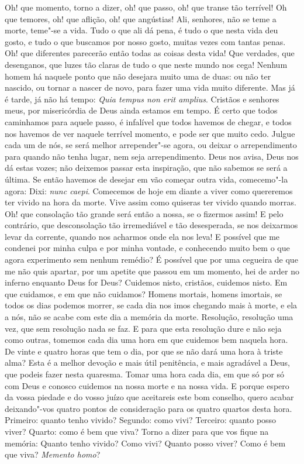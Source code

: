 Oh! que momento, torno a dizer, oh! que passo, oh! que transe
tão terrível! Oh que temores, oh! que aflição, oh! que angústias! Ali,
senhores, não se teme a morte, teme"-se a vida. Tudo o que ali dá pena, é
tudo o que nesta vida deu gosto, e tudo o que buscamos por nosso gosto,
muitas vezes com tantas penas. Oh! que diferentes parecerão então todas
as coisas desta vida! Que verdades, que desenganos, que luzes tão claras
de tudo o que neste mundo nos cega! Nenhum homem há naquele ponto que
não desejara muito uma de duas: ou não ter nascido, ou tornar a nascer
de novo, para fazer uma vida muito diferente. Mas já é tarde, já não há
tempo: \emph{Quia tempus non erit amplius}. Cristãos e %
senhores meus, por misericórdia de Deus ainda estamos em tempo. É certo
que todos caminhamos para aquele passo, é infalível que todos havemos de
chegar, e todos nos havemos de ver naquele terrível momento, e pode ser
que muito cedo. Julgue cada um de nós, se será melhor arrepender"-se
agora, ou deixar o arrependimento para quando não tenha lugar, nem seja
arrependimento. Deus nos avisa, Deus nos dá estas vozes; não deixemos
passar esta inspiração, que não sabemos se será a última. Se então
havemos de desejar em vão começar outra vida, comecemo"-la agora: Dixi:
\emph{nunc caepi}. Comecemos de hoje em diante a viver como quereremos
ter vivido na hora da morte. Vive assim como quiseras ter vivido quando
morras. Oh! que consolação tão grande será então a nossa, se o fizermos
assim! E pelo contrário, que desconsolação tão irremediável e tão
desesperada, se nos deixarmos levar da corrente, quando nos acharmos
onde ela nos leva! E possível que me condenei por minha culpa e por
minha vontade, e conhecendo muito bem o que agora experimento sem nenhum
remédio? É possível que por uma cegueira de que me não quis apartar, por
um apetite que passou em um momento, hei de arder no inferno enquanto
Deus for Deus? Cuidemos nisto, cristãos, cuidemos nisto. Em que
cuidamos, e em que não cuidamos? Homens mortais, homens imortais, se
todos os dias podemos morrer, se cada dia nos imos chegando mais à
morte, e ela a nós, não se acabe com este dia a memória da morte.
Resolução, resolução uma vez, que sem resolução nada se faz. E para que
esta resolução dure e não seja como outras, tomemos cada dia uma hora em
que cuidemos bem naquela hora. De vinte e quatro horas que tem o dia,
por que se não dará uma hora à triste alma? Esta é a melhor devoção e
mais útil penitência, e mais agradável a
Deus, que podeis fazer nesta quaresma. Tomar uma hora cada dia, em que
só por só com Deus e conosco cuidemos na nossa morte e na nossa vida. E
porque espero da vossa piedade e do vosso juízo que aceitareis este bom
conselho, quero acabar deixando"-vos quatro pontos de consideração para
os quatro quartos desta hora. Primeiro: quanto tenho vivido? Segundo:
como vivi? Terceiro: quanto posso viver? Quarto: como é bem que viva?
Torno a dizer para que vos fique na memória: Quanto tenho vivido? Como
vivi? Quanto posso viver? Como é bem que viva? \emph{Memento homo}?

